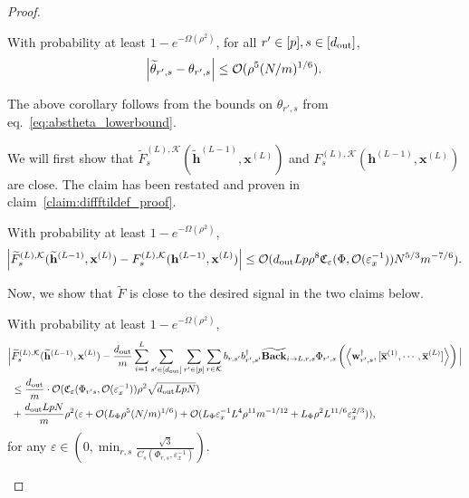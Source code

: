 \begin{proof}
\begin{corollary}
	\label{cor:tildetheta_diff_theta}
	With probability at least $1-e^{-\Omega(\rho^2)}$, for all $r' \in [p], s \in [d_{\mathrm{out}} ]$,
	\begin{align*}
		\abs{\widetilde{\theta}_{r', s} - \theta_{r', s}} \le \mathcal{O}(\rho^5 (N/m)^{1/6}).
	\end{align*}
\end{corollary}
The above corollary follows from the bounds on $\theta_{r',s}$ from eq.~\ref{eq:abstheta_lowerbound}.


We will first show that $\widetilde{F}_{s}^{(L), \mathcal{K}}(\widetilde{\mathbf{h}}^{(L-1)}, \mathbf{x}^{(L)})$ and $F_{s}^{(L), \mathcal{K}}(\mathbf{h}^{(L-1)}, \mathbf{x}^{(L)})$ are close. The claim has been restated and proven in claim~\ref{claim:diffftildef_proof}.

\begin{claim}\label{claim:diffftildef}
	With probability at least $1-e^{-\Omega(\rho^2)}$,
	\begingroup\allowdisplaybreaks
	\begin{align*}
		\abs{\widetilde{F}_{s}^{(L), \mathcal{K}}(\widetilde{\mathbf{h}}^{(L-1)}, \mathbf{x}^{(L)}) - F_{s}^{(L), \mathcal{K}}(\mathbf{h}^{(L-1)}, \mathbf{x}^{(L)})} \le \mathcal{O}(d_{\mathrm{out}} Lp\rho^8  \mathfrak{C}_{\varepsilon}(\Phi, \mathcal{O}(\varepsilon_x^{-1})) N^{5/3} m^{-7/6}).
	\end{align*}
	\endgroup
\end{claim}



Now, we show that $\widetilde{F}$ is close to the desired signal in the two claims below. 
	\begin{claim}\label{claim:difftildefphi}
	With probability at least $1-e^{-\Omega(\rho^2)}$,
	\begin{align*}
		\Big|&\widetilde{F}_{s}^{(L), \mathcal{K}}(\widetilde{\mathbf{h}}^{(L-1)}, \mathbf{x}^{(L)}) - \frac{d_{\mathrm{out}} }{m} \sum_{i=1}^{L}  \sum_{s' \in [d_{\mathrm{out}} ]} \sum_{r' \in [p]} \sum_{r \in \mathcal{K}}  b_{r, s'} b_{r', s'}^{\dagger} \widetilde{\mathbf{Back}}_{i \to L, r, s} \Phi_{r', s} \left(\left\langle \mathbf{w}_{r', s}^{\dagger}, [\overline{\mathbf{x}}^{(1)}, \cdots, \overline{\mathbf{x}}^{(L)}]\right\rangle\right)\Big| \\&\le \frac{d_{\mathrm{out}} }{m} \cdot \mathcal{O}(\mathfrak{C}_{\varepsilon}(\Phi_{r' s}, \mathcal{O}(\varepsilon_x^{-1})) \rho^2 \sqrt{d_{\mathrm{out}} LpN}) \\& + \frac{d_{\mathrm{out}} LpN}{m} \rho^2 (\varepsilon + \mathcal{O}( L_{\Phi}\rho^5 (N/m)^{1/6}) + \mathcal{O}(L_{\Phi}\varepsilon_x^{-1}  L^4 \rho^{11} m^{-1/12} +  L_{\Phi} \rho^2 L^{11/6} \varepsilon_x^{2/3})),
	\end{align*}
	for any $\varepsilon \in (0, \min_{r, s} \frac{\sqrt{3}}{C_s(\Phi_{r, s}, \varepsilon_x^{-1})})$.
\end{claim}



\end{proof}
